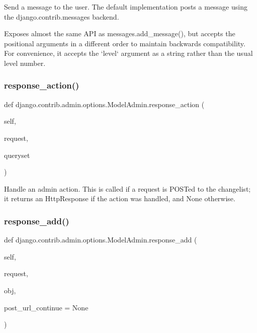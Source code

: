 \begin{DoxyVerb}Send a message to the user. The default implementation
posts a message using the django.contrib.messages backend.

Exposes almost the same API as messages.add_message(), but accepts the
positional arguments in a different order to maintain backwards
compatibility. For convenience, it accepts the `level` argument as
a string rather than the usual level number.
\end{DoxyVerb}
 \mbox{\label{classdjango_1_1contrib_1_1admin_1_1options_1_1_model_admin_a3c460b92c84678ac41d455e3e891961f}} 
\subsubsection{\texorpdfstring{response\+\_\+action()}{response\_action()}}
{\footnotesize\ttfamily def django.\+contrib.\+admin.\+options.\+Model\+Admin.\+response\+\_\+action (\begin{DoxyParamCaption}\item[{}]{self,  }\item[{}]{request,  }\item[{}]{queryset }\end{DoxyParamCaption})}

\begin{DoxyVerb}Handle an admin action. This is called if a request is POSTed to the
changelist; it returns an HttpResponse if the action was handled, and
None otherwise.
\end{DoxyVerb}
 \mbox{\label{classdjango_1_1contrib_1_1admin_1_1options_1_1_model_admin_a2ee06720815845c7a2dd5ff4d4287c79}} 
\subsubsection{\texorpdfstring{response\+\_\+add()}{response\_add()}}
{\footnotesize\ttfamily def django.\+contrib.\+admin.\+options.\+Model\+Admin.\+response\+\_\+add (\begin{DoxyParamCaption}\item[{}]{self,  }\item[{}]{request,  }\item[{}]{obj,  }\item[{}]{post\+\_\+url\+\_\+continue = {\ttfamily None} }\end{DoxyParamCaption})}


